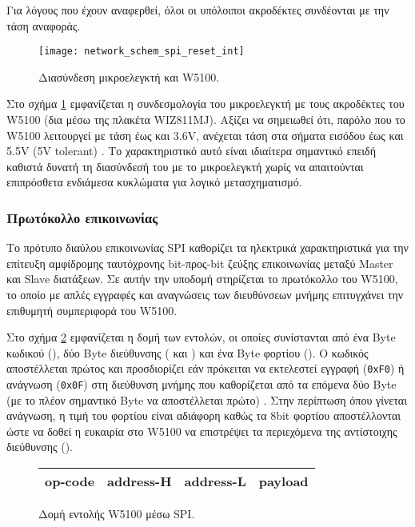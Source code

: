 Για λόγους που έχουν αναφερθεί, όλοι οι υπόλοιποι ακροδέκτες συνδέονται με την
τάση αναφοράς.

\begin{figure}
    \caption{Διασύνδεση μικροελεγκτή και W5100.
    \label{fig:network:spi_reset_int}}
    \begin{center}
    \texttt{[image: network\_schem\_spi\_reset\_int]}
    \end{center}
\end{figure}

Στο σχήμα \ref{fig:network:spi_reset_int} εμφανίζεται η συνδεσμολογία του
μικροελεγκτή με τους ακροδέκτες του W5100 (δια μέσω της πλακέτα WIZ811MJ).
Αξίζει να σημειωθεί ότι, παρόλο που το W5100 λειτουργεί με τάση έως και 3.6V,
ανέχεται τάση στα σήματα εισόδου έως και 5.5V (\textenglish{5V tolerant})
\parencite[64]{wiz11:w5100}. Το χαρακτηριστικό αυτό είναι ιδιαίτερα σημαντικό
επειδή καθιστά δυνατή τη διασύνδεσή του με το μικροελεγκτή χωρίς να απαιτούνται
επιπρόσθετα ενδιάμεσα κυκλώματα για λογικό μετασχηματισμό. %


\subsubsection{Πρωτόκολλο επικοινωνίας}

Το πρότυπο διαύλου επικοινωνίας SPI καθορίζει τα ηλεκτρικά χαρακτηριστικά για
την επίτευξη αμφίδρομης ταυτόχρονης bit-προς-bit ζεύξης επικοινωνίας μεταξύ
Master και Slave διατάξεων.
Σε αυτήν την υποδομή στηρίζεται το πρωτόκολλο του W5100, το οποίο με απλές
εγγραφές και αναγνώσεις των διευθύνσεων μνήμης επιτυγχάνει την επιθυμητή
συμπεριφορά του W5100.

Στο σχήμα \ref{fig:network:w5100-command-format} εμφανίζεται η δομή των εντολών,
οι οποίες συνίστανται από ένα Byte κωδικού (), δύο Byte διεύθυνσης
( και ) και ένα Byte φορτίου (). Ο
κωδικός αποστέλλεται πρώτος και προσδιορίζει εάν πρόκειται να εκτελεστεί εγγραφή
(\verb~0xF0~) ή ανάγνωση (\verb~0x0F~) στη διεύθυνση μνήμης που καθορίζεται από
τα επόμενα δύο Byte (με το πλέον σημαντικό Byte να αποστέλλεται πρώτο)
\parencite[61]{wiz11:w5100}.
Στην περίπτωση όπου γίνεται ανάγνωση, η τιμή του φορτίου είναι αδιάφορη καθώς τα
8bit φορτίου αποστέλλονται ώστε να δοθεί η ευκαιρία στο W5100 να επιστρέψει τα
περιεχόμενα της αντίστοιχης διεύθυνσης ().

\begin{figure}
    \caption{Δομή εντολής W5100 μέσω SPI.
    \label{fig:network:w5100-command-format}}
    \begin{center}\begin{tabu} spread 0pt {|*4{X[1,c]|}}

    \hline
    op-code & address-H & address-L & payload \\
    \hline

    \end{tabu}\end{center}
\end{figure}

